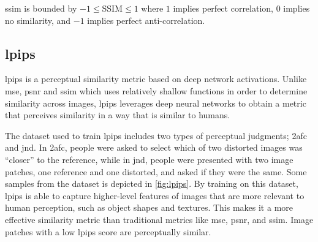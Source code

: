 


\begin{comment}
\begin{itemize}
    \item $\mu$ represents the pixel sample mean for both $x$ and $y$,
    \item $\sigma^2$ represents the variance for both $x$ and $y$,
    \item $\sigma_{xy}$ represents the covariance of x and y,
    \item $c_1 = (k_1L)^2$, $c_2 = (k_2L)^2$ are variables to stabilize the division with weak denominator,
    \item $L$ represents the dynamic range of the pixel-values,
    \item $k_1 = 0.01$, $k_2 = 0.03$ by default   
\end{itemize}
\end{comment}

\acrshort{ssim} is bounded by $-1 \leq \text{SSIM} \leq 1$ where $1$ implies perfect correlation, $0$ implies no similarity, and $-1$ implies perfect anti-correlation.


\subsection[LPIPS]{\acrfull{lpips}}
\acrshort{lpips} \cite{zhang_unreasonable_2018} is a perceptual similarity metric based on deep network activations. Unlike \acrshort{mse}, \acrshort{psnr} and \acrshort{ssim} which uses relatively shallow functions in order to determine similarity across images, \acrshort{lpips} leverages deep neural networks to obtain a metric that perceives similarity in a way that is similar to humans. 

The dataset used to train \acrshort{lpips} includes two types of perceptual judgments; \acrfull{2afc} and \acrfull{jnd}. In \acrshort{2afc}, people were asked to select which of two distorted images was “closer” to the reference, while in \acrshort{jnd}, people were presented with two image patches, one reference and one distorted, and asked if they were the same. Some samples from the dataset is depicted in \autoref{fig:lpips}. By training on this dataset, \acrshort{lpips} is able to capture higher-level features of images that are more relevant to human perception, such as object shapes and textures. This makes it a more effective similarity metric than traditional metrics like \acrshort{mse}, \acrshort{psnr}, and \acrshort{ssim}. Image patches with a low \acrshort{lpips} score are perceptually similar.

